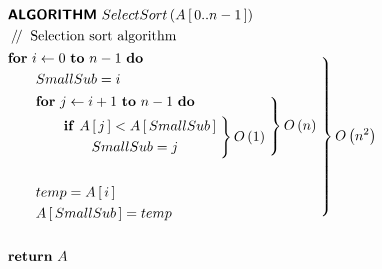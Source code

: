 \begin{fleqn}
	\begin{align*}
		& \text{\textbf{\textsf{ALGORITHM}}} \ SelectSort\left( A\left[ \,0..n-1\, \right] \right) \\
		& \mathbin{/\mkern-3mu/} \text{ Selection sort algorithm} \\
		& \begin{aligned}
			& \text{\textbf{for}} \ i \leftarrow  0 \ \text{\textbf{to}} \ n - 1 \ \text{\textbf{do}} \ \\
			& \qquad SmallSub = i \\
			& \begin{aligned}
				& \qquad \text{\textbf{for}} \ j \leftarrow  i + 1 \ \text{\textbf{to}} \ n - 1 \ \text{\textbf{do}} \ \\
				& \begin{aligned}
					& \qquad \qquad \text{\textbf{if}} \ A\left[ \,j\, \right] < A\left[ \,SmallSub\, \right] \\
					& \qquad \qquad \qquad SmallSub = j 
				\end{aligned} \left.\vphantom{\begin{aligned}\\\\\end{aligned}} \right\} O\left( 1 \right) 
			\end{aligned} \left.\vphantom{\begin{aligned}\\\\\\\end{aligned}} \right\} O\left( n \right) \\
			& \\
			& \qquad temp = A\left[ \,i\, \right] \\
			& \qquad A\left[ \,SmallSub\, \right] = temp 
		\end{aligned} \left.\vphantom{\begin{aligned}\\\\\\\\\\\\\\\\\end{aligned}} \right\} O\left( n^2 \right) \\
		& \\
		& \text{\textbf{return}} \ A
	\end{align*}
\end{fleqn}